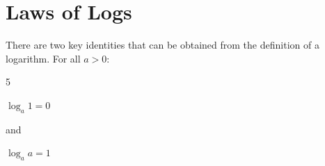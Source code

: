 \documentclass[
  11pt,
  openany]{book}
\begin{document}
\pagebreak

\section{Laws of Logs}\label{laws-of-logs}

\vspace{-0.5cm}

There are two key identities that can be obtained from the definition of a logarithm. For all \(a>0\):

\begin{multicols}{5}

\begin{center}
\begin{tcolorbox}[colback=white,width=3.5cm,colframe=white,height=1cm]

\end{tcolorbox}
\end{center}

\begin{center}
\begin{tcolorbox}[colback=red!5,width=3.5cm,colframe=red!70!black,height=1cm]

\begin{center}
$\log_a{1}=0$ 
\end{center}

\end{tcolorbox}
\end{center}

\begin{center}
\begin{tcolorbox}[colback=white,width=3.5cm,colframe=white,height=1cm]

\begin{center}
and
\end{center}

\end{tcolorbox}
\end{center}

\begin{center}
\begin{tcolorbox}[colback=red!5,width=3.5cm,colframe=red!70!black,height=1cm]

\begin{center}
$\log_a{a}=1$ 
\end{center}

\end{tcolorbox}
\end{center}

\begin{center}
\begin{tcolorbox}[colback=white,width=3.5cm,colframe=white,height=1cm]


\end{tcolorbox}
\end{center}

\end{multicols}
\end{document}
